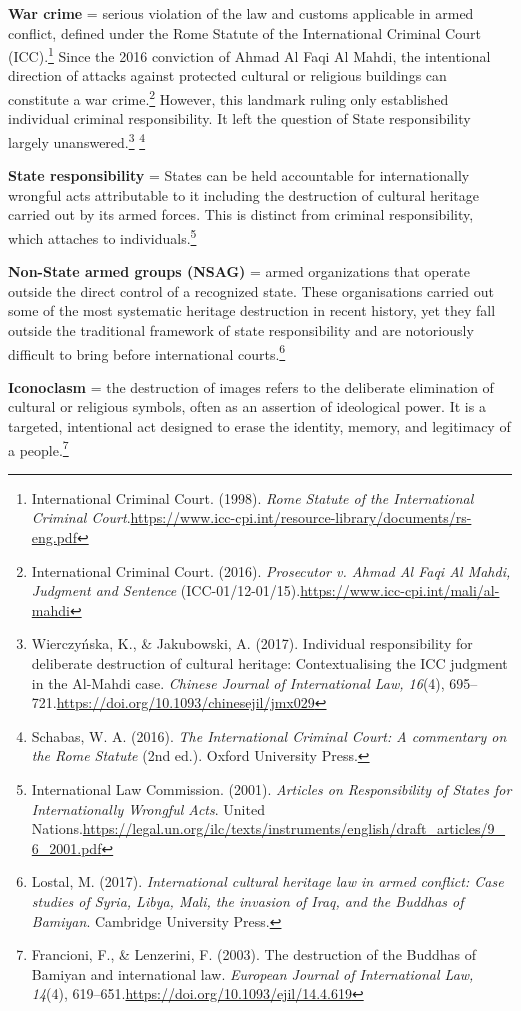 \textbf{War crime} = serious violation of the law and customs applicable in armed conflict, defined under the Rome Statute of the International Criminal Court (ICC).\footnote{International Criminal Court. (1998). \emph{Rome Statute of the International Criminal Court}.\url{https://www.icc-cpi.int/resource-library/documents/rs-eng.pdf}} Since the 2016 conviction of Ahmad Al Faqi Al Mahdi, the intentional direction of attacks against protected cultural or religious buildings can constitute a war crime.\footnote{International Criminal Court. (2016). \emph{Prosecutor v. Ahmad Al Faqi Al Mahdi, Judgment and Sentence} (ICC-01/12-01/15).\url{https://www.icc-cpi.int/mali/al-mahdi}} However, this landmark ruling only established individual criminal responsibility. It left the question of State responsibility largely unanswered.\footnote{Wierczyńska, K., \& Jakubowski, A. (2017). Individual responsibility for deliberate destruction of cultural heritage: Contextualising the ICC judgment in the Al-Mahdi case. \emph{Chinese Journal of International Law, 16}(4), 695–721.\url{https://doi.org/10.1093/chinesejil/jmx029}} \footnote{Schabas, W. A. (2016). \emph{The International Criminal Court: A commentary on the Rome Statute} (2nd ed.). Oxford University Press.}\par \textbf{State responsibility} = States can be held accountable for internationally wrongful acts attributable to it including the destruction of cultural heritage carried out by its armed forces.   This is distinct from criminal responsibility, which attaches to individuals.\footnote{International Law Commission. (2001). \emph{Articles on Responsibility of States for Internationally Wrongful Acts}. United Nations.\url{https://legal.un.org/ilc/texts/instruments/english/draft_articles/9_6_2001.pdf}}

\textbf{Non-State armed groups (NSAG)} = armed organizations that operate outside the direct control of a recognized state. These organisations carried out some of the most systematic heritage destruction in recent history, yet they fall outside the traditional framework of state responsibility and are notoriously difficult to bring before international courts.\footnote{Lostal, M. (2017). \emph{International cultural heritage law in armed conflict: Case studies of Syria, Libya, Mali, the invasion of Iraq, and the Buddhas of Bamiyan}. Cambridge University Press.}

\textbf{Iconoclasm} = the destruction of images refers to the deliberate elimination of cultural or religious symbols, often as an assertion of ideological power. It is a targeted, intentional act designed to erase the identity, memory, and legitimacy of a people.\footnote{Francioni, F., \& Lenzerini, F. (2003). The destruction of the Buddhas of Bamiyan and international law. \emph{European Journal of International Law, 14}(4), 619–651.\url{https://doi.org/10.1093/ejil/14.4.619}}

